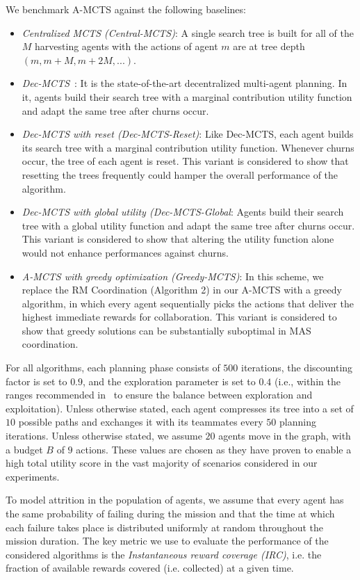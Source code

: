We benchmark A-MCTS against the following baselines:
\begin{itemize}[leftmargin=*]
    \item \emph{Centralized MCTS (Central-MCTS)}: A single search tree is built for all of the $M$ harvesting agents with the actions of agent $m$ are at tree depth $(m, m + M, m + 2M,...)$.
    \item \emph{Dec-MCTS}~\citep{best2019dec}: It is the state-of-the-art decentralized multi-agent planning. In it, agents build their search tree with a marginal contribution utility function and adapt the same tree after churns occur.
    \item \emph{Dec-MCTS with reset (Dec-MCTS-Reset)}: Like Dec-MCTS, each agent builds its search tree with a marginal contribution utility function. Whenever churns occur, the tree of each agent is reset. This variant is considered to show that resetting the trees frequently could hamper the overall performance of the algorithm.
    \item \emph{Dec-MCTS with global utility (Dec-MCTS-Global}: Agents build their search tree with a global utility function and adapt the same tree after churns occur. This variant is considered to show that altering the utility function alone would not enhance performances against churns.
    \item \emph{A-MCTS with greedy optimization (Greedy-MCTS)}: In this scheme, we replace the RM Coordination (Algorithm 2) in our A-MCTS with a greedy algorithm, in which every agent sequentially picks the actions that deliver the highest immediate rewards for collaboration. This variant is considered to show that greedy solutions can be substantially suboptimal in MAS coordination.
\end{itemize}

For all algorithms, each planning phase consists of $500$ iterations, the discounting factor is set to $0.9$, and the exploration parameter is set to $0.4$ (i.e., within the ranges recommended in~\citep{best2019dec} to ensure the balance between exploration and exploitation). Unless otherwise stated, each agent compresses its tree into a set of $10$ possible paths and exchanges it with its teammates every $50$ planning iterations. Unless otherwise stated, we assume $20$ agents move in the graph, with a budget $B$ of $9$ actions. These values are chosen as they have proven to enable a high total utility score in the vast majority of scenarios considered in our experiments.

To model attrition in the population of agents, we assume that every agent has the same probability of failing during the mission and that the time at which each failure takes place is distributed uniformly at random throughout the mission duration. The key metric we use to evaluate the performance of the considered algorithms is the \emph{Instantaneous reward coverage (IRC)}, i.e. the fraction of available rewards covered (i.e. collected) at a given time.

